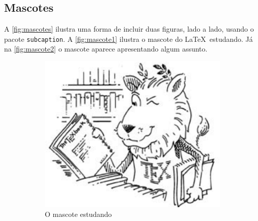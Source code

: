 \subsection{Mascotes}\label{sec:mascotes}


A \autoref{fig:mascotes} ilustra uma forma de incluir duas figuras, lado a lado, usando o pacote \texttt{subcaption}. A \autoref{fig:mascote1} ilustra o mascote do \LaTeX~estudando. Já na \autoref{fig:mascote2} o mascote aparece apresentando algum assunto. 

\begin{figure}[ht]
	\centering
	\caption{O mascote do~\LaTeX~em diferentes poses}\label{fig:mascotes}

	\begin{subfigure}[t]{.4\textwidth}
        \centering
        \includegraphics[width=\textwidth]{figuras/lion.pdf}
        \caption{O mascote estudando}\label{fig:mascote1}
    \end{subfigure}
    \begin{subfigure}[t]{.4\textwidth}
        \centering

\end{subfigure}
\end{figure}
